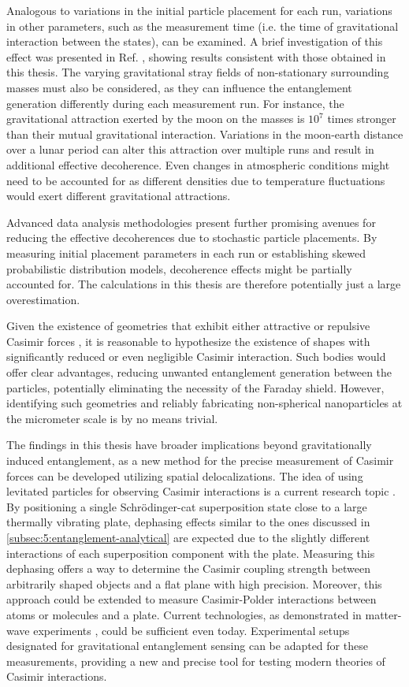 Analogous to variations in the initial particle placement for each run, variations in other parameters, such as the measurement time (i.e. the time of gravitational interaction between the states), can be examined.
A brief investigation of this effect was presented in Ref. \cite{Nguyen_2020}, showing results consistent with those obtained in this thesis.
The varying gravitational stray fields of non-stationary surrounding masses must also be considered, as they can influence the entanglement generation differently during each measurement run. For instance, the gravitational attraction exerted by the moon on the masses is $10^7$ times stronger than their mutual gravitational interaction.
Variations in the moon-earth distance over a lunar period can alter this attraction over multiple runs and result in additional effective decoherence.
Even changes in atmospheric conditions might need to be accounted for as different densities due to temperature fluctuations would exert different gravitational attractions.

Advanced data analysis methodologies present further promising avenues for reducing the effective decoherences due to stochastic particle placements.
By measuring initial placement parameters in each run or establishing skewed probabilistic distribution models, decoherence effects might be partially accounted for. The calculations in this thesis are therefore potentially just a large overestimation. 

Given the existence of geometries that exhibit either attractive or repulsive Casimir forces \cite{Boyer_1968}, it is reasonable to hypothesize the existence of shapes with significantly reduced or even negligible Casimir interaction.
Such bodies would offer clear advantages, reducing unwanted entanglement generation between the particles, potentially eliminating the necessity of the Faraday shield.
However, identifying such geometries and reliably fabricating non-spherical nanoparticles at the micrometer scale is by no means trivial.

The findings in this thesis have broader implications beyond gravitationally induced entanglement, as a new method for the precise measurement of Casimir forces can be developed utilizing spatial delocalizations.
The idea of using levitated particles for observing Casimir interactions is a current research topic \cite{Xu_2024}.
By positioning a single Schrödinger-cat superposition state close to a large thermally vibrating plate, dephasing effects similar to the ones discussed in \cref{subsec:5:entanglement-analytical} are expected due to the slightly different interactions of each superposition component with the plate.
Measuring this dephasing offers a way to determine the Casimir coupling strength between arbitrarily shaped objects and a flat plane with high precision.
Moreover, this approach could be extended to measure Casimir-Polder interactions between atoms or molecules and a plate.
Current technologies, as demonstrated in matter-wave experiments \cite{Fein_2019}, could be sufficient even today.
Experimental setups designated for gravitational entanglement sensing can be adapted for these measurements, providing a new and precise tool for testing modern theories of Casimir interactions.



